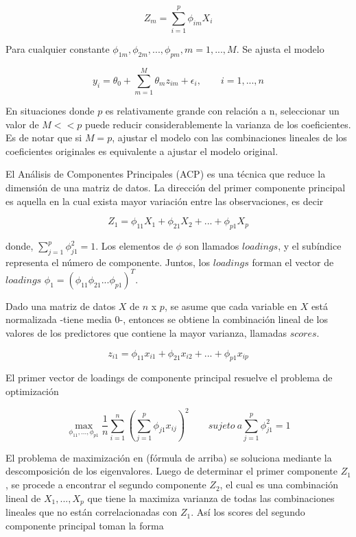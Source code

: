 \documentclass[a4paper,12pt]{Latex/Classes/PhDthesisPSnPDF}
\begin{document}
$$ Z_{m} = \sum_{i = 1}^{p} \phi_{im}X_{i} $$

Para cualquier constante $ \phi_{1m}, \phi_{2m}, ..., \phi_{pm}, m = 1, ..., M $. Se ajusta el modelo

$$ y_{i} = \theta_{0} + \sum_{m = 1}^{M} \theta_{m}z_{im} + \epsilon_{i},  \qquad i = 1, ..., n $$

En situaciones donde $p$ es relativamente grande con relación a n, seleccionar un valor de $M << p$ puede reducir considerablemente la varianza de los coeficientes. Es de notar que si $M = p$, ajustar el modelo con las combinaciones lineales de los coeficientes originales es equivalente a ajustar el modelo original.

El Análisis de Componentes Principales (ACP) es una técnica que reduce la dimensión de una matriz de datos. La dirección del primer componente principal es aquella en la cual exista mayor variación entre las observaciones, es decir

$$ Z_{1} = \phi_{11}X_{1} + \phi_{21}X_{2} + ... + \phi_{p1}X_{p} $$

donde, $ \sum_{j=1}^{p} \phi_{j1}^{2} = 1 $. Los elementos de $ \phi $ son llamados $loadings$, y el subíndice representa el número de componente. Juntos, los $loadings$ forman el vector de $loadings$ $\phi_{1} = (\phi_{11} \phi_{21}... \phi_{p1})^T$.

Dado una matriz de datos $X$ de $n$ x $p$, se asume que cada variable en $X$ está normalizada -tiene media 0-, entonces se obtiene la combinación lineal de los valores de los predictores que contiene la mayor varianza, llamadas $scores$.

$$ z_{i1} = \phi_{11} x_{i1} + \phi_{21} x_{i2} + ... + \phi_{p1} x_{ip} $$

El primer vector de loadings de componente principal resuelve el problema de optimización

$$ \max_{\phi_{11}, ..., \phi_{p1}}
\frac{1}{n} \sum_{i = 1}^{n} (\sum_{j=1}^{p} \phi_{j1} x_{ij})^2
\qquad sujeto \ a  \sum_{j=1}^{p} \phi_{j1}^{2} = 1
$$

El problema de maximización en (fórmula de arriba) se soluciona mediante la descomposición de los eigenvalores. Luego de determinar el primer componente $Z_{1}$, se procede a encontrar el segundo componente $Z_{2}$, el cual es una combinación lineal de $ X_{1}, ..., X_{p} $ que tiene la maximiza varianza de todas las combinaciones lineales que no están correlacionadas con $Z_{1}$. Así los scores del segundo componente principal toman la forma
\end{document}
